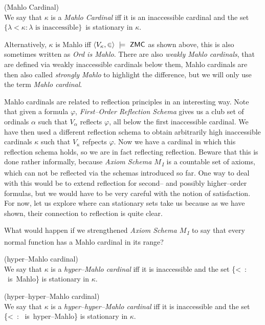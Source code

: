 \begin{definition}{(Mahlo Cardinal)}\label{def:mahlo_cardinal}\\
We say that $\kappa$ is a \emph{Mahlo Cardinal} iff it is an inaccessible cardinal and the set $\{\lambda < \kappa : \lambda \mbox{ is inaccessible}\}$ is stationary in $\kappa$.
\end{definition}

Alternatively, $\kappa$ is Mahlo iff $\langle V_\kappa, \in \rangle~\models~\sf{ZMC}$ as shown above, this is also sometimes written as \emph{Ord is Mahlo}. There are also \emph{weakly Mahlo cardinals}, that are defined via weakly inaccessible cardinals below them, Mahlo cardinals are then also called \emph{strongly Mahlo} to highlight the difference, but we will only use the term \emph{Mahlo cardinal}.

Mahlo cardinals are related to reflection principles in an interesting way. Note that given a formula $\varphi$, \emph{First–Order Reflection Schema} gives us a club set of ordinals $\alpha$ such that $V_\alpha$ reflects $\varphi$, all below the first inaccessible cardinal. We have then used a different reflection schema to obtain arbitrarily high inaccessible cardinals $\kappa$ such that $V_\kappa$ refpects $\varphi$. Now we have a cardinal in which this reflection schema holds, so we are in fact reflecting reflection. Beware that this is done rather informally, because \emph{Axiom Schema $M$\textsubscript{1}} is a countable set of axioms, which can not be reflected via the schemas introduced so far. One way to deal with this would be to extend reflection for second– and possibly higher–order formulas, but we would have to be very careful with the notion of satisfaction. %
For now, let us explore where can stationary sets take us because as we have shown, their connection to reflection is quite clear.

What would happen if we strengthened \emph{Axiom Schema $M$\textsubscript{1}} to say that every normal function has a Mahlo cardinal in its range?

\begin{definition}{(hyper–Mahlo cardinal)}\label{def:hyper_mahlo_cardinal}\\
We say that $\kappa$ is a \emph{hyper–Mahlo cardinal} iff it is inaccessible and the set 
\beq
\{\lambda < \kappa : \lambda \mbox{ is Mahlo}\}
\eeq
is stationary in $\kappa$.
\end{definition}

\begin{definition}{(hyper–hyper–Mahlo cardinal)}\label{def:hyper_hyper_mahlo_cardinal}\\
We say that $\kappa$ is a \emph{hyper–hyper–Mahlo cardinal} iff it is inaccessible and the set 
\beq
\{\lambda < \kappa : \lambda \mbox{ is hyper–Mahlo}\}
\eeq
is stationary in $\kappa$.
\end{definition}

